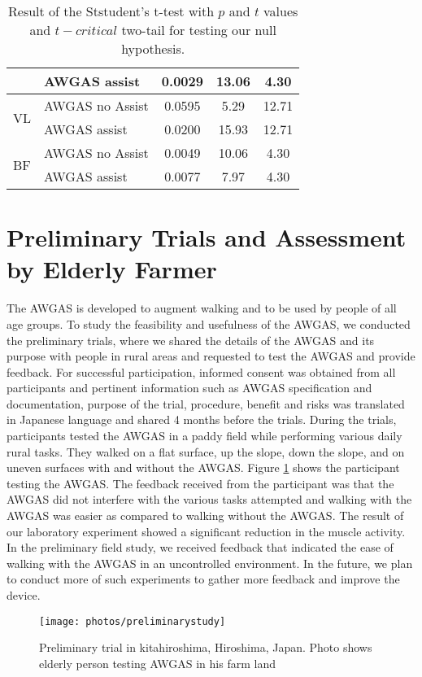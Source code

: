\documentclass[paper,JRM,paper]{jaciiiarticle}
\begin{document}
\begin{table}[h]
{\begin{tabular}{@{}llccc@{}}
		& AWGAS assist                   & 0.0029  & 13.06   & 4.30                                                           \\ \midrule
		\multirow{2}{*}{VL}  & AWGAS no Assist                & 0.0595  & 5.29    & 12.71                                                          \\ 
		& AWGAS assist                   & 0.0200  & 15.93   & 12.71                                                          \\ \midrule
		\multirow{2}{*}{BF}  & AWGAS no Assist                & 0.0049  & 10.06   & 4.30                                                           \\ 
		& AWGAS assist                   & 0.0077  & 7.97    & 4.30                                                           \\ \bottomrule
	\end{tabular}
	}
	\caption{Result of the Ststudent's t-test with $p$ and $t$ values and $t-critical$ two-tail for testing our null hypothesis.}
	\label{ttestresult}
\end{table}

\section{Preliminary Trials and Assessment by Elderly Farmer}

The AWGAS is developed to augment walking and to be used by people of all age groups. To study the feasibility and usefulness of the AWGAS, we conducted the preliminary trials, where we shared the details of the AWGAS and its purpose with people in rural areas and requested to test the AWGAS and provide feedback. For successful participation, informed consent was obtained from all participants and pertinent information such as AWGAS specification and documentation, purpose of the trial, procedure, benefit and risks was translated in Japanese language and shared 4 months before the trials. During the trials, participants tested the AWGAS in a paddy field while performing various daily rural tasks. They walked on a flat surface, up the slope, down the slope, and on uneven surfaces with and without the AWGAS. Figure \ref{fig:preliminarystudy} shows the participant testing the AWGAS. The feedback received from the participant was that the AWGAS did not interfere with the various tasks attempted and walking with the AWGAS was easier as compared to walking without the AWGAS. The result of our laboratory experiment showed a significant reduction in the muscle activity. In the preliminary field study, we received feedback that indicated the ease of walking with the AWGAS in an uncontrolled environment. In the future, we plan to conduct more of such experiments to gather more feedback and improve the device.
\begin{figure}[h]
	\centering
	\texttt{[image: photos/preliminarystudy]}
	\caption{Preliminary trial in kitahiroshima, Hiroshima, Japan. Photo shows elderly person testing AWGAS in his farm land}
	\label{fig:preliminarystudy}
\end{figure}
\end{document}
